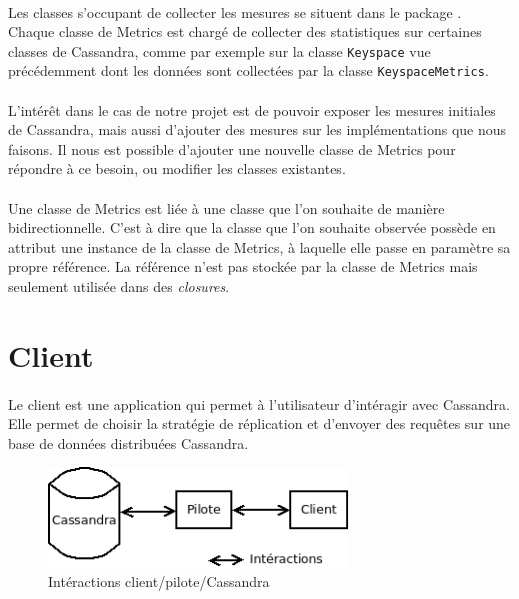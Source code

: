 \documentclass[12pt]{article}
\newcommand{\class}[1]{\texttt{#1}}
\begin{document}
\paragraph{} Les classes s'occupant de collecter les mesures se situent dans le package . Chaque classe de Metrics est chargé de collecter des statistiques sur certaines classes de Cassandra, comme par exemple sur la classe \class{Keyspace} vue précédemment dont les données sont collectées par la classe \class{KeyspaceMetrics}.

\paragraph{} L'intérêt dans le cas de notre projet est de pouvoir exposer les mesures initiales de Cassandra, mais aussi d'ajouter des mesures sur les implémentations que nous faisons. Il nous est possible d'ajouter une nouvelle classe de Metrics pour répondre à ce besoin, ou modifier les classes existantes.

\paragraph{} Une classe de Metrics est liée à une classe que l'on souhaite de manière bidirectionnelle. C'est à dire que la classe que l'on souhaite observée possède en attribut une instance de la classe de Metrics, à laquelle elle passe en paramètre sa propre référence. La référence n'est pas stockée par la classe de Metrics mais seulement utilisée dans des \textit{closures}.


\newpage

\section{Client}

\paragraph{} Le client est une application qui permet à l'utilisateur d'intéragir avec Cassandra. 
Elle permet de choisir la stratégie de réplication et d'envoyer des requêtes sur une base de données distribuées Cassandra.

\begin{figure}[H]
	\centering
		\includegraphics[width=8cm]{schemas/pilote.png}
	\caption{Intéractions client/pilote/Cassandra \label{fig:pilote}}
\end{figure}
\end{document}
